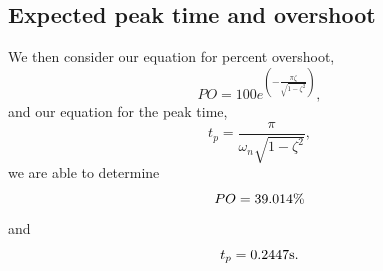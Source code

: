 \documentclass{article}
\begin{document}
\subsection{Expected peak time and overshoot}
We then consider our equation for percent overshoot,
\begin{equation}
    PO=100e^{\left(-\frac{\pi\zeta}{\sqrt{1-\zeta^2}}\right)},
\end{equation}
and our equation for the peak time,
\begin{equation}
    t_p=\frac{\pi}{\omega_n\sqrt{1-\zeta^2}},
\end{equation}
we are able to determine
\begin{equation} \notag
    PO=39.014\%
\end{equation}
and
\begin{equation} \notag
    t_p=0.2447\text{s}.
\end{equation}
\end{document}
